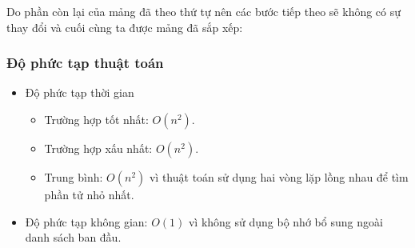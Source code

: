Do phần còn lại của mảng đã theo thứ tự nên các bước tiếp theo sẽ 
không có sự thay đổi và cuối cùng ta được mảng đã sắp xếp:

\begin{center}
\end{center}

\subsubsection{Độ phức tạp thuật toán \textnormal{\cite{code-selection}}}

\begin{itemize}
    \item Độ phức tạp thời gian
    \begin{itemize}[label=$\circ$]
        \item Trường hợp tốt nhất: $O\left(n^2\right)$.
        \item Trường hợp xấu nhất: $O\left(n^2\right)$.
        \item Trung bình: $O\left(n^2\right)$ vì thuật toán sử dụng 
        hai vòng lặp lồng nhau để tìm phần tử nhỏ nhất.
    \end{itemize}
    \item Độ phức tạp không gian: $O\left(1\right)$ vì không sử dụng 
    bộ nhớ bổ sung ngoài danh sách ban đầu.
\end{itemize}